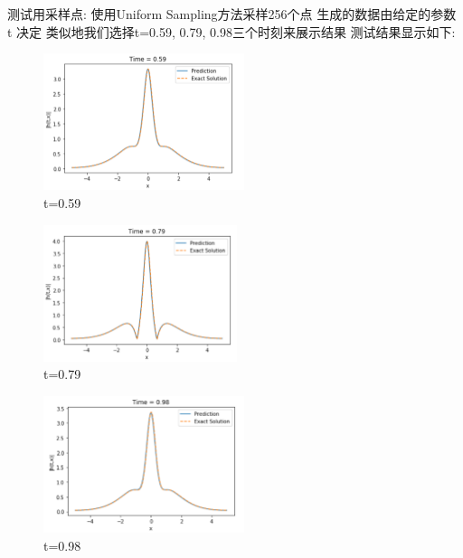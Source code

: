 \documentclass[addpoints,answers]{exam}
\begin{document}
    
    
    测试用采样点: 使用Uniform Sampling方法采样256个点
    生成的数据由给定的参数 t 决定
    类似地我们选择t=0.59, 0.79, 0.98三个时刻来展示结果
    测试结果显示如下:
    \clearpage
    \vspace{0.5cm}
    \vspace{0.5cm}
    \begin{figure}
    	\centering
    	\includegraphics[height=4cm]{1.png}
    	\caption{t=0.59}
    \end{figure}
    
    \begin{figure}
    	\centering
    	\includegraphics[height=4cm]{2.png}
    	\caption{t=0.79}
    \end{figure}
    
    \begin{figure}
    	\centering
    	\includegraphics[height=4cm]{3.png}
    	\caption{t=0.98}
    \end{figure}
    
    \clearpage
\end{document}
